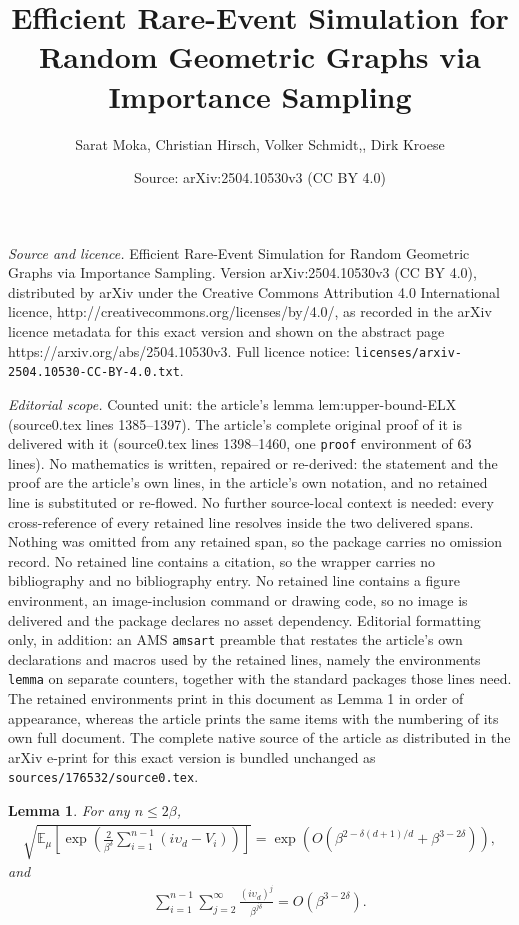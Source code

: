 \documentclass[10pt,a4paper]{amsart}
\title{Efficient Rare-Event Simulation for Random Geometric Graphs via Importance Sampling}
\author{Sarat Moka, Christian Hirsch, Volker Schmidt,, Dirk Kroese}
\date{Source: arXiv:2504.10530v3 (CC BY 4.0)}
\newtheorem{lemma}{Lemma}
\newcommand{\ee}{\mathbb{E}}
\newcommand{\lt}{\left}
\newcommand{\rt}{\right}
\begin{document}
\maketitle

\noindent\emph{Source and licence.} Efficient Rare-Event Simulation for Random Geometric Graphs via Importance Sampling. Version arXiv:2504.10530v3 (CC BY 4.0), distributed by arXiv under the Creative Commons Attribution 4.0 International licence, http://creativecommons.org/licenses/by/4.0/, as recorded in the arXiv licence metadata for this exact version and shown on the abstract page https://arxiv.org/abs/2504.10530v3. Full licence notice: \texttt{licenses/arxiv-2504.10530-CC-BY-4.0.txt}.\par\smallskip

\noindent\textit{Editorial scope.} Counted unit: the article's lemma lem:upper-bound-ELX (source0.tex lines 1385--1397). The article's complete original proof of it is delivered with it (source0.tex lines 1398--1460, one \texttt{proof} environment of 63 lines). No mathematics is written, repaired or re-derived: the statement and the proof are the article's own lines, in the article's own notation, and no retained line is substituted or re-flowed.  No further source-local context is needed: every cross-reference of every retained line resolves inside the two delivered spans.  Nothing was omitted from any retained span, so the package carries no omission record.  No retained line contains a citation, so the wrapper carries no bibliography and no bibliography entry.  No retained line contains a figure environment, an image-inclusion command or drawing code, so no image is delivered and the package declares no asset dependency.  Editorial formatting only, in addition: an AMS \texttt{amsart} preamble that restates the article's own declarations and macros used by the retained lines, namely the environments \texttt{lemma} on separate counters, together with the standard packages those lines need.  The retained environments print in this document as Lemma 1 in order of appearance, whereas the article prints the same items with the numbering of its own full document.  The complete native source of the article as distributed in the arXiv e-print for this exact version is bundled unchanged as \texttt{sources/176532/source0.tex}.
\begin{lemma}
    \label{lem:upper-bound-ELX}
    For any $n \leq 2\beta$, 
    \begin{align}
    \sqrt{\ee_\mu\lt[\exp\lt(\frac{2}{\beta^{\delta}}  \sum_{i =1}^{n-1} (i\upsilon_d - V_i)\rt)\rt]} = \exp\lt( O\lt(\beta^{2 -{\delta(d+1)/d}} + \beta^{3 - 2\delta} \rt)\rt),
    \label{eqn:part1-of-lemma}
\end{align}
and 
\begin{align}
 \sum_{i = 1}^{n -1} \sum_{j = 2}^\infty\frac{(i\upsilon_d)^j}{\beta^{j\delta}} = O( \beta^{3 - 2\delta}). 
\label{eqn:part2-of-lemma}
\end{align}
\end{lemma}
\end{document}
